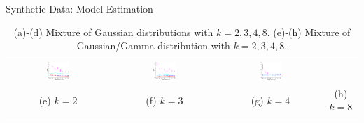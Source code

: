\documentclass[final,t]{beamer}
\begin{document}
\begin{frame}{}
\begin{columns}[T]
\begin{column}{0.3\linewidth}
\begin{block}{Synthetic Data: Model Estimation}
\begin{table}
\begin{tabular}{cccc}
          \includegraphics[width=0.23\textwidth]{../experiment/figure_new/sp_diff_heter_k_3_view_3-crop} &
          \includegraphics[width=0.23\textwidth]{../experiment/figure_new/sp_diff_heter_k_4_view_1-crop} &
          \includegraphics[width=0.23\textwidth]{../experiment/figure_new/sp_diff_heter_k_8_view_1-crop} \\[-1mm]
          (e) $k=2$ & (f) $k=3$ & (g)  $k=4$ & (h) $k=8$ \\[-1mm]
        \end{tabular}
        \vspace{-2mm}
        \caption{(a)-(d) Mixture of Gaussian distributions with $k=2,3,4,8$. (e)-(h) Mixture of Gaussian/Gamma distribution with $k=2,3,4,8$. }
      \end{table}
    \vspace{-0.3in}
    \end{block}


\end{column}
\end{columns}
\end{frame}
\end{document}
